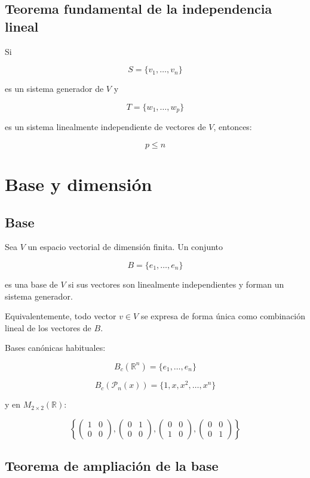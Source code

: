 \documentclass[11pt,a4paper]{article}
\newcommand{\R}{\mathbb{R}}
\newcommand{\Pn}{\mathcal{P}}
\begin{document}
\subsection{Teorema fundamental de la independencia lineal}

Si

\[
S=\{v_1,\ldots,v_n\}
\]

es un sistema generador de $V$ y

\[
T=\{w_1,\ldots,w_p\}
\]

es un sistema linealmente independiente de vectores de $V$, entonces:

\[
\boxed{p\leq n}
\]

\section{Base y dimensión}

\subsection{Base}

Sea $V$ un espacio vectorial de dimensión finita. Un conjunto

\[
B=\{e_1,\ldots,e_n\}
\]

es una base de $V$ si sus vectores son linealmente independientes y forman un sistema generador.

Equivalentemente, todo vector $v\in V$ se expresa de forma única como combinación lineal de los vectores de $B$.

Bases canónicas habituales:

\[
B_c(\R^n)
=
\{e_1,\ldots,e_n\}
\]

\[
B_c(\Pn_n(x))
=
\{1,x,x^2,\ldots,x^n\}
\]

y en $M_{2\times2}(\R)$:

\[
\left\{
\begin{pmatrix}1&0\\0&0\end{pmatrix},
\begin{pmatrix}0&1\\0&0\end{pmatrix},
\begin{pmatrix}0&0\\1&0\end{pmatrix},
\begin{pmatrix}0&0\\0&1\end{pmatrix}
\right\}
\]

\subsection{Teorema de ampliación de la base}
\end{document}
